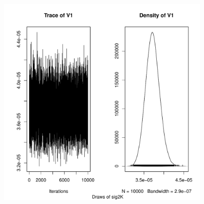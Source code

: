 \documentclass[10pt]{article}
\begin{document}
\begin{figure}
\centering
\includegraphics[width=0.95\textwidth]{figures/diag-sig2K.pdf}
\caption{}
\label{fig:diag-sig2K}
\end{figure}



%
\end{document}
